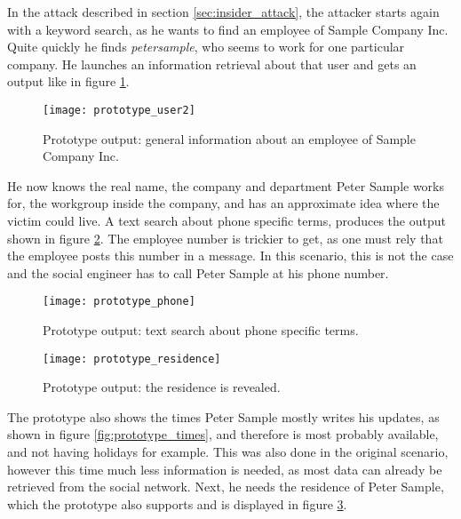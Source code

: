 In the attack described in section \ref{sec:insider_attack}, the attacker
starts again with a keyword search, as he wants to find an employee of Sample
Company Inc. Quite quickly he finds \textit{petersample}, who seems to work for
one particular company. He launches an information retrieval about that user
and gets an output like in figure \ref{fig:prototype_user2}.

\begin{figure}[htb]
  \begin{center}
    \texttt{[image: prototype\_user2]}
    \caption{Prototype output: general information about an employee of Sample
    Company Inc.}
    \label{fig:prototype_user2}
  \end{center}
\end{figure}

He now knows the real name, the company and department Peter Sample works for,
the workgroup inside the company, and has an approximate idea where the victim
could live. A text search about phone specific terms, produces the output
shown in figure \ref{fig:prototype_phone}. The employee number is
trickier to get, as one must rely that the employee posts this number in a
message. In this scenario, this is not the case and the social engineer has to
call Peter Sample at his phone number.

\begin{figure}[htb]
  \begin{center}
    \texttt{[image: prototype\_phone]}
    \caption{Prototype output: text search about phone specific terms.}
    \label{fig:prototype_phone}
  \end{center}
\end{figure}


\begin{figure}[htb]
  \begin{center}
    \texttt{[image: prototype\_residence]}
    \caption{Prototype output: the residence is revealed.}
    \label{fig:prototype_residence}
  \end{center}
\end{figure}

The prototype also shows the times Peter Sample mostly writes his updates, as
shown in figure \ref{fig:prototype_times}, and therefore is most probably
available, and not having holidays for example. This was also done in the
original scenario, however this time much less information is needed, as most
data can already be retrieved from the social network. Next, he needs the residence
of Peter Sample, which the prototype also supports and is displayed in figure
\ref{fig:prototype_residence}.

